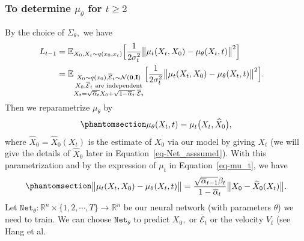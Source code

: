 \documentclass[
]{article}
\theoremstyle{remark}
\begin{document}
\begin{itemize}
  \subsubsection{\texorpdfstring{To determine \(\mu_{\theta}\) for
  \(t\geq 2\)}{To determine \textbackslash mu\_\{\textbackslash theta\} for t\textbackslash geq 2}}\label{to-determine-mu_theta-for-tgeq-2}

  By the choice of \(\Sigma_{\theta},\) we have \[
  \begin{aligned}
    L_{t-1} 
    &= \mathbb E_{X_0,X_t\sim q(x_0,x_t)} \Bigl[ \frac{1}{2\sigma_t^2} \bigl\lVert \mu_t(X_t,X_0) - \mu_{\theta}(X_t,t) \bigr\rVert^2 \Bigr] \cr 
    &= \mathbb E_{\substack{X_0\sim q(x_0), \overline{\mathcal{E}}_t\sim \mathcal{N}(\mathbf{0},\mathbf{I})\\ X_0,\overline{\mathcal{E}}_t \text{ are independent} \\X_t=\sqrt{\overline{\alpha}_t}X_0+\sqrt{1-\overline{\alpha}_t}\cdot \overline{\mathcal{E}}_t}} \Bigl[ \frac{1}{2\sigma_t^2} \bigl\lVert \mu_t(X_t,X_0) - \mu_{\theta}(X_t,t) \bigr\rVert^2 \Bigr].
  \end{aligned}
  \] Then we reparametrize \(\mu_{\theta}\) by
  \begin{equation}\phantomsection\label{eq-mu_the_mu_t}{
  \begin{aligned}
    \mu_{\theta}(X_t,t)=\mu_t\bigl(X_t, \widehat{X}_0\bigr),
  \end{aligned}
  }\end{equation} where \(\widehat{X}_0=\widehat{X}_0(X_t)\) is the
  estimate of \(X_0\) via our model by giving \(X_t\) (we will give the
  details of \(\widehat{X}_0\) later in Equation~\ref{eq-Net_asssume1}).
  With this parametrization and by the expression of \(\mu_{t}\) in
  Equation~\ref{eq-mu_t}, we have
  \begin{equation}\phantomsection\label{eq-Net_asssume0}{
  \begin{aligned}
    \bigl\lVert \mu_t(X_t,X_0) - \mu_{\theta}(X_t,t)  \bigr\rVert 
    = \frac{\sqrt{\overline{\alpha}_{t-1}}\beta_t}{1-\overline{\alpha}_t}\big\lVert X_0 - \widehat{X}_0(X_t) \big\rVert.
  \end{aligned}
  }\end{equation} Let
  \(\mathtt{Net}_{\theta}:\mathbb R^n\times \lbrace 1,2,\cdots,T\rbrace \longrightarrow \mathbb R^n\)
  be our neural network (with parameters \(\theta\)) we need to train.
  We can choose \(\mathtt{Net}_{\theta}\) to predict \(X_0,\) or
  \(\overline{\mathcal{E}}_t\) or the velocity \(V_t\) (see Hang et al.

\end{itemize}
\end{document}

